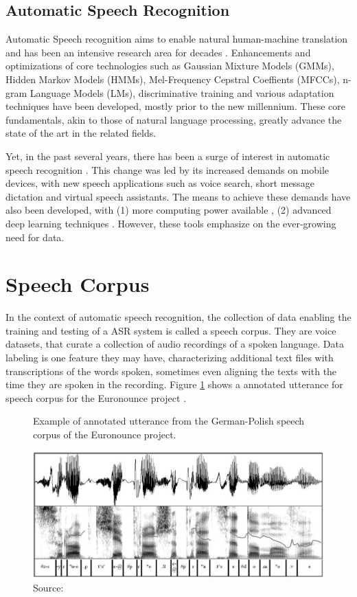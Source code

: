 \subsection{Automatic Speech Recognition}

Automatic Speech recognition aims to enable natural human-machine translation and has been an intensive research area for decades \cite{yu2016automatic}. Enhancements and optimizations of core technologies such as Gaussian Mixture Models (GMMs), Hidden Markov Models (HMMs), Mel-Frequency Cepstral Coeffients (MFCCs), n-gram Language Models (LMs), discriminative training and various adaptation techniques have been developed, mostly prior to the new millennium. These core fundamentals, akin to those of natural language processing, greatly advance the state of the art in the related fields.

Yet, in the past several years, there has been a surge of interest in automatic speech recognition \cite{jurafsky2016speech}. This change was led by its increased demands on mobile devices, with new speech applications such as voice search, short message dictation and virtual speech assistants. The means to achieve these demands have also been developed, with (1) more computing power available \cite{ECONOMOU2004279}, (2) advanced deep learning techniques \cite{graves2013speech}. However, these tools emphasize on the ever-growing need for data.

\section{Speech Corpus}

In the context of automatic speech recognition, the collection of data enabling the training and testing of a ASR system is called a speech corpus. They are voice datasets, that curate a collection of audio recordings of a spoken language. Data labeling is one feature they may have, characterizing additional text files with transcriptions of the words spoken, sometimes even aligning the texts with the time they are spoken in the recording. Figure \ref{fig:annotated-speech-corpus} shows a annotated utterance for speech corpus for the Euronounce project \cite{demenko2009applying}.

\begin{figure}[h]
    \centering
    \caption{Example of annotated utterance from the German-Polish speech corpus of the Euronounce project.}
    \includegraphics[width=0.8\linewidth]{images/background/annotated-speech-corpus.png}
    \caption*{Source: \cite{demenko2009applying}}
    \label{fig:annotated-speech-corpus}
\end{figure}

